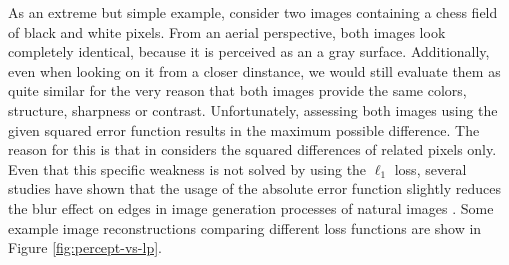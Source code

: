As an extreme but simple example, consider two images containing a chess field of black and white pixels. From an aerial perspective, both images look completely identical, because it is perceived as an a gray surface. Additionally, even when looking on it from a closer dinstance, we would still evaluate them as quite similar for the very reason that both images provide the same colors, structure, sharpness or contrast. Unfortunately, assessing both images using the given squared error function results in the maximum possible difference. The reason for this is that in considers the squared differences of related pixels only. Even that this specific weakness is not solved by using the $ \ell_{1} $ loss, several studies have shown that the usage of the absolute error function slightly reduces the blur effect on edges in image generation processes of natural images \parencite{loss-func-img-proc} \parencite{deep_multiscale_video_pred}. Some example image reconstructions comparing different loss functions are show in Figure \ref{fig:percept-vs-lp}.

